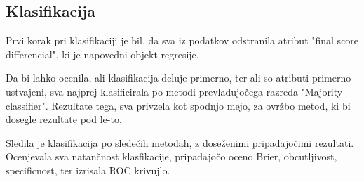 \documentclass[a4paper,11pt]{article}
\begin{document}
\subsection{Klasifikacija}

Prvi korak pri klasifikaciji je bil, da sva iz podatkov odstranila atribut 
"final score differencial", ki je napovedni objekt regresije.

Da bi lahko ocenila, ali klasifikacija deluje primerno, ter ali so atributi 
primerno ustvajeni, sva najprej klasificirala po metodi prevladujočega razreda 
"Majority classifier". Rezultate tega, sva privzela kot spodnjo mejo, za ovržbo 
metod, ki bi dosegle rezultate pod le-to.

Sledila je klasifikacija po sledečih metodah, z doseženimi pripadajočimi 
rezultati. Ocenjevala sva natančnost klasfikacije, pripadajočo oceno Brier, 
obcutljivost, specificnost, ter izrisala ROC krivujlo.
\end{document}
